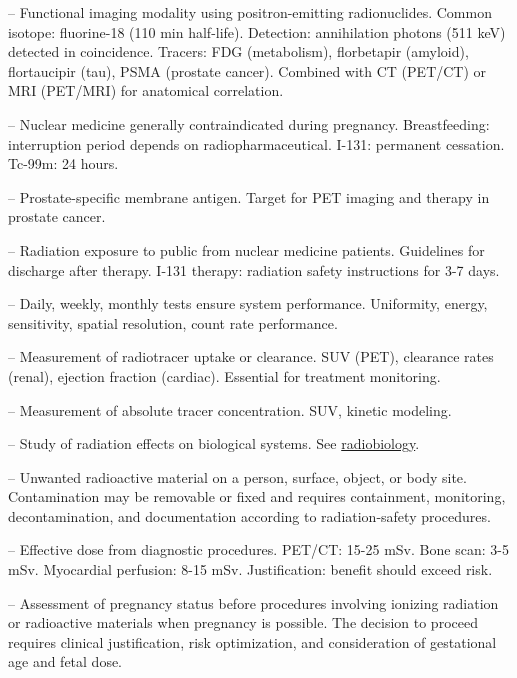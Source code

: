 -- Functional imaging modality using positron-emitting radionuclides. Common isotope: fluorine-18 (110 min half-life). Detection: annihilation photons (511 keV) detected in coincidence. Tracers: FDG (metabolism), florbetapir (amyloid), flortaucipir (tau), PSMA (prostate cancer). Combined with CT (PET/CT) or MRI (PET/MRI) for anatomical correlation.

-- Nuclear medicine generally contraindicated during pregnancy. Breastfeeding: interruption period depends on radiopharmaceutical. I-131: permanent cessation. Tc-99m: 24 hours.

-- Prostate-specific membrane antigen. Target for PET imaging and therapy in prostate cancer.

-- Radiation exposure to public from nuclear medicine patients. Guidelines for discharge after therapy. I-131 therapy: radiation safety instructions for 3-7 days.

-- Daily, weekly, monthly tests ensure system performance. Uniformity, energy, sensitivity, spatial resolution, count rate performance.

-- Measurement of radiotracer uptake or clearance. SUV (PET), clearance rates (renal), ejection fraction (cardiac). Essential for treatment monitoring.

-- Measurement of absolute tracer concentration. SUV, kinetic modeling.

-- Study of radiation effects on biological systems. See \hyperlink{Radiobiology}{radiobiology}.

-- Unwanted radioactive material on a person, surface, object, or body site. Contamination may be removable or fixed and requires containment, monitoring, decontamination, and documentation according to radiation-safety procedures.

-- Effective dose from diagnostic procedures. PET/CT: 15-25 mSv. Bone scan: 3-5 mSv. Myocardial perfusion: 8-15 mSv. Justification: benefit should exceed risk.

-- Assessment of pregnancy status before procedures involving ionizing radiation or radioactive materials when pregnancy is possible. The decision to proceed requires clinical justification, risk optimization, and consideration of gestational age and fetal dose.

